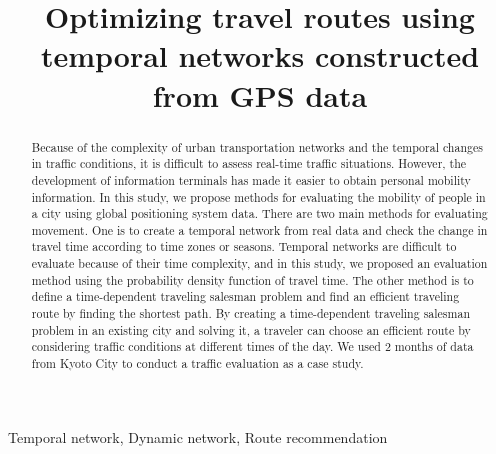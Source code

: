 \documentclass[conference]{IEEEtran}
\begin{document}
\title{Optimizing travel routes using temporal networks constructed from GPS data}

\author{
}

\maketitle

\begin{abstract}
\par Because of the complexity of urban transportation networks and the temporal changes in traffic conditions, it is difficult to assess real-time traffic situations. 
However, the development of information terminals has made it easier to obtain personal mobility information.
In this study, we propose methods for evaluating the mobility of people in a city using global positioning system data.
There are two main methods for evaluating movement.
One is to create a temporal network from real data and check the change in travel time according to time zones or seasons.
Temporal networks are difficult to evaluate because of their time complexity, and in this study, we proposed an evaluation method using the probability density function of travel time.
The other method is to define a time-dependent traveling salesman problem and find an efficient traveling route by finding the shortest path.
By creating a time-dependent traveling salesman problem in an existing city and solving it, a traveler can choose an efficient route by considering traffic conditions at different times of the day.
We used 2 months of data from Kyoto City to conduct a traffic evaluation as a case study.
\end{abstract}

\begin{IEEEkeywords}
Temporal network, Dynamic network, Route recommendation
\end{IEEEkeywords}
\end{document}
